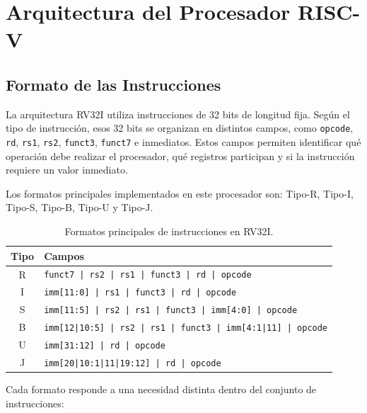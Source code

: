 \newpage

\section{Arquitectura del Procesador RISC-V}

\subsection{Formato de las Instrucciones}
La arquitectura RV32I utiliza instrucciones de 32 bits de longitud fija. Según el tipo de instrucción, esos 32 bits se organizan en distintos campos, como \texttt{opcode}, \texttt{rd}, \texttt{rs1}, \texttt{rs2}, \texttt{funct3}, \texttt{funct7} e inmediatos. Estos campos permiten identificar qué operación debe realizar el procesador, qué registros participan y si la instrucción requiere un valor inmediato.

Los formatos principales implementados en este procesador son: Tipo-R, Tipo-I, Tipo-S, Tipo-B, Tipo-U y Tipo-J.

\begin{table}[h]
\centering
\begin{tabular}{|c|p{10cm}|}
\hline
\textbf{Tipo} & \textbf{Campos} \\ \hline
R & \texttt{funct7 | rs2 | rs1 | funct3 | rd | opcode} \\ \hline
I & \texttt{imm[11:0] | rs1 | funct3 | rd | opcode} \\ \hline
S & \texttt{imm[11:5] | rs2 | rs1 | funct3 | imm[4:0] | opcode} \\ \hline
B & \texttt{imm[12|10:5] | rs2 | rs1 | funct3 | imm[4:1|11] | opcode} \\ \hline
U & \texttt{imm[31:12] | rd | opcode} \\ \hline
J & \texttt{imm[20|10:1|11|19:12] | rd | opcode} \\ \hline
\end{tabular}
\caption{Formatos principales de instrucciones en RV32I.}
\end{table}

Cada formato responde a una necesidad distinta dentro del conjunto de instrucciones:

